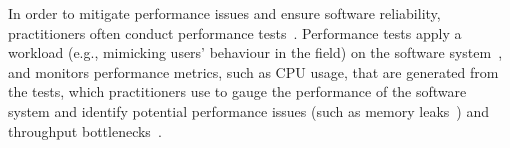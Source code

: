 


In order to mitigate performance issues and ensure software reliability, practitioners often conduct performance tests~\cite{futureofspe}. Performance tests apply a workload (e.g., mimicking users' behaviour in the field) on the software system~\cite{ranjanbook,Syer2016}, and monitors performance metrics, such as CPU usage, that are generated from the tests, which practitioners use to gauge the performance of the software system and identify potential performance issues (such as memory leaks~\cite{markicsm2013}) and throughput bottlenecks~\cite{5635038}.



